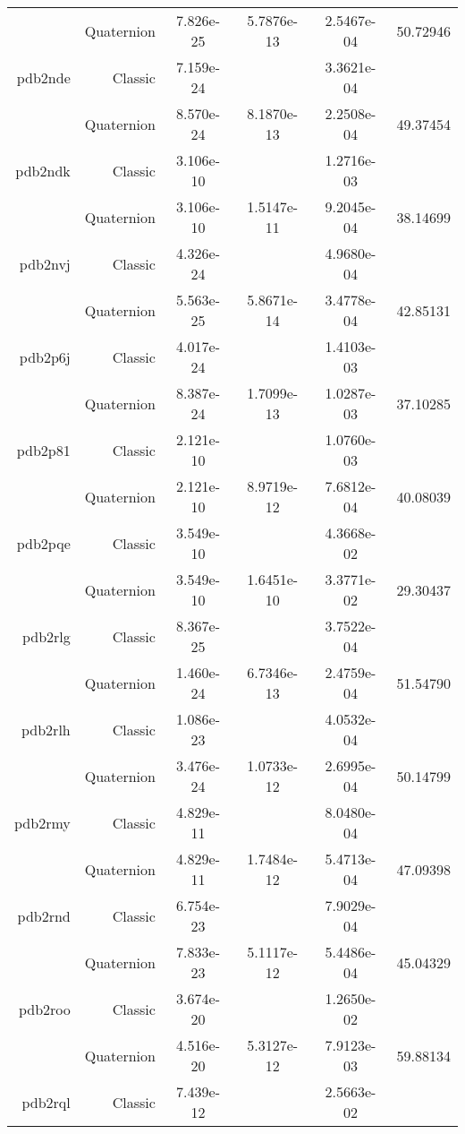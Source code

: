 \begin{xltabular}{\textwidth}{r|rS[table-format=1.3e+2]S[table-format=1.4e+2]S[table-format=1.4e+2]S[table-format=-1.5]}
& Quaternion & 7.826e-25 & 5.7876e-13 & 2.5467e-04 & 50.72946\\  \addlinespace
pdb2nde & Classic & 7.159e-24 &  & 3.3621e-04 & \\
& Quaternion & 8.570e-24 & 8.1870e-13 & 2.2508e-04 & 49.37454\\  \addlinespace
pdb2ndk & Classic & 3.106e-10 &  & 1.2716e-03 & \\
& Quaternion & 3.106e-10 & 1.5147e-11 & 9.2045e-04 & 38.14699\\  \addlinespace
pdb2nvj & Classic & 4.326e-24 &  & 4.9680e-04 & \\
& Quaternion & 5.563e-25 & 5.8671e-14 & 3.4778e-04 & 42.85131\\  \addlinespace
pdb2p6j & Classic & 4.017e-24 &  & 1.4103e-03 & \\
& Quaternion & 8.387e-24 & 1.7099e-13 & 1.0287e-03 & 37.10285\\  \addlinespace
pdb2p81 & Classic & 2.121e-10 &  & 1.0760e-03 & \\
& Quaternion & 2.121e-10 & 8.9719e-12 & 7.6812e-04 & 40.08039\\  \addlinespace
pdb2pqe & Classic & 3.549e-10 &  & 4.3668e-02 & \\
& Quaternion & 3.549e-10 & 1.6451e-10 & 3.3771e-02 & 29.30437\\  \addlinespace
pdb2rlg & Classic & 8.367e-25 &  & 3.7522e-04 & \\
& Quaternion & 1.460e-24 & 6.7346e-13 & 2.4759e-04 & 51.54790\\  \addlinespace
pdb2rlh & Classic & 1.086e-23 &  & 4.0532e-04 & \\
& Quaternion & 3.476e-24 & 1.0733e-12 & 2.6995e-04 & 50.14799\\  \addlinespace
pdb2rmy & Classic & 4.829e-11 &  & 8.0480e-04 & \\
& Quaternion & 4.829e-11 & 1.7484e-12 & 5.4713e-04 & 47.09398\\  \addlinespace
pdb2rnd & Classic & 6.754e-23 &  & 7.9029e-04 & \\
& Quaternion & 7.833e-23 & 5.1117e-12 & 5.4486e-04 & 45.04329\\  \addlinespace
pdb2roo & Classic & 3.674e-20 &  & 1.2650e-02 & \\
& Quaternion & 4.516e-20 & 5.3127e-12 & 7.9123e-03 & 59.88134\\  \addlinespace
pdb2rql & Classic & 7.439e-12 &  & 2.5663e-02 & \\

\end{xltabular}
